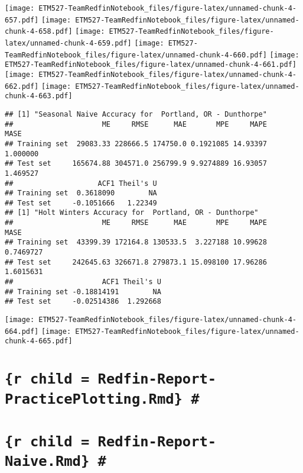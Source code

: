 \documentclass[]{article}
\begin{document}
\texttt{[image: ETM527-TeamRedfinNotebook\_files/figure-latex/unnamed-chunk-4-657.pdf]}
\texttt{[image: ETM527-TeamRedfinNotebook\_files/figure-latex/unnamed-chunk-4-658.pdf]}
\texttt{[image: ETM527-TeamRedfinNotebook\_files/figure-latex/unnamed-chunk-4-659.pdf]}
\texttt{[image: ETM527-TeamRedfinNotebook\_files/figure-latex/unnamed-chunk-4-660.pdf]}
\texttt{[image: ETM527-TeamRedfinNotebook\_files/figure-latex/unnamed-chunk-4-661.pdf]}
\texttt{[image: ETM527-TeamRedfinNotebook\_files/figure-latex/unnamed-chunk-4-662.pdf]}
\texttt{[image: ETM527-TeamRedfinNotebook\_files/figure-latex/unnamed-chunk-4-663.pdf]}

\begin{verbatim}
## [1] "Seasonal Naive Accuracy for  Portland, OR - Dunthorpe"
##                     ME     RMSE      MAE       MPE     MAPE     MASE
## Training set  29083.33 228666.5 174750.0 0.1921085 14.93397 1.000000
## Test set     165674.88 304571.0 256799.9 9.9274889 16.93057 1.469527
##                    ACF1 Theil's U
## Training set  0.3618090        NA
## Test set     -0.1051666   1.22349
## [1] "Holt Winters Accuracy for  Portland, OR - Dunthorpe"
##                     ME     RMSE      MAE       MPE     MAPE      MASE
## Training set  43399.39 172164.8 130533.5  3.227188 10.99628 0.7469727
## Test set     242645.63 326671.8 279873.1 15.098100 17.96286 1.6015631
##                     ACF1 Theil's U
## Training set -0.18814191        NA
## Test set     -0.02514386  1.292668
\end{verbatim}

\texttt{[image: ETM527-TeamRedfinNotebook\_files/figure-latex/unnamed-chunk-4-664.pdf]}
\texttt{[image: ETM527-TeamRedfinNotebook\_files/figure-latex/unnamed-chunk-4-665.pdf]}

\section{\texorpdfstring{\texttt{\{r\ child\ =\ \textquotesingle{}Redfin-Report-PracticePlotting.Rmd\textquotesingle{}\}\ \#}}{\{r child = 'Redfin-Report-PracticePlotting.Rmd'\} \#}}\label{r-child-redfin-report-practiceplotting.rmd}

\section{\texorpdfstring{\texttt{\{r\ child\ =\ \textquotesingle{}Redfin-Report-Naive.Rmd\textquotesingle{}\}\ \#}}{\{r child = 'Redfin-Report-Naive.Rmd'\} \#}}\label{r-child-redfin-report-naive.rmd}
\end{document}
